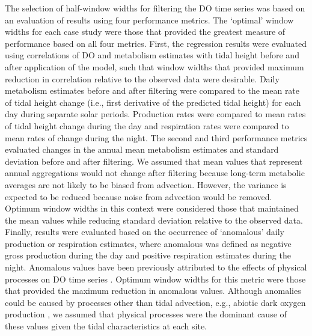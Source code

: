 \documentclass[letterpaper,12pt,oneside]{article}\usepackage[]{graphicx}\usepackage[]{color}
\begin{document}
The selection of half-window widths for filtering the \ac{DO} time series was based on an evaluation of results using four performance metrics.  The `optimal' window widths for each case study were those that provided the greatest measure of performance based on all four metrics.  First, the regression results were evaluated using correlations of \ac{DO} and metabolism estimates with tidal height before and after application of the model, such that window widths that provided maximum reduction in correlation relative to the observed data were desirable.  Daily metabolism estimates before and after filtering were compared to the mean rate of tidal height change (i.e., first derivative of the predicted tidal height) for each day during separate solar periods.  Production rates were compared to mean rates of tidal height change during the day and respiration rates were compared to mean rates of change during the night.  The second and third performance metrics evaluated changes in the annual mean metabolism estimates and standard deviation before and after filtering.  We assumed that mean values that represent annual aggregations would not change after filtering because long-term metabolic averages are not likely to be biased from advection.  However, the variance is expected to be reduced because noise from advection would be removed.  Optimum window widths in this context were considered those that maintained the mean values while reducing standard deviation relative to the observed data. Finally, results were evaluated based on the occurrence of `anomalous' daily production or respiration estimates, where anomalous was defined as negative gross production during the day and positive respiration estimates during the night.  Anomalous values have been previously attributed to the effects of physical processes on \ac{DO} time series \citep{Caffrey03}. Optimum window widths for this metric were those that provided the maximum reduction in anomalous values.  Although anomalies could be caused by processes other than tidal advection, e.g., abiotic dark oxygen production \citep{Pamatmat97}, we assumed that physical processes were the dominant cause of these values given the tidal characteristics at each site.
\end{document}
